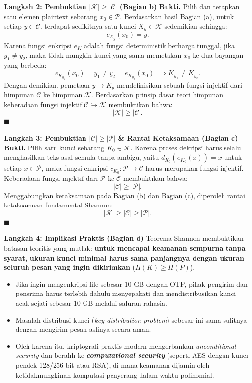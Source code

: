 \documentclass[11pt,a4paper]{article}
\newenvironment{proof}{\noindent\textbf{Bukti.}}{\hfill$\blacksquare$\vspace{0.3em}}
\begin{document}
\noindent\textbf{Langkah 2: Pembuktian $|\mathcal{K}| \ge |\mathcal{C}|$ (Bagian b)}
\begin{proof}
Pilih dan tetapkan satu elemen plaintext sebarang $x_0 \in \mathcal{P}$.
Berdasarkan hasil Bagian (a), untuk setiap $y \in \mathcal{C}$, terdapat sedikitnya satu kunci $K_y \in \mathcal{K}$ sedemikian sehingga:
\[
e_{K_y}(x_0) = y.
\]
Karena fungsi enkripsi $e_K$ adalah fungsi deterministik berharga tunggal, jika $y_1 \neq y_2$, maka tidak mungkin kunci yang sama memetakan $x_0$ ke dua bayangan yang berbeda:
\[
e_{K_{y_1}}(x_0) = y_1 \neq y_2 = e_{K_{y_2}}(x_0) \implies K_{y_1} \neq K_{y_2}.
\]
Dengan demikian, pemetaan $y \mapsto K_y$ mendefinisikan sebuah fungsi injektif dari himpunan $\mathcal{C}$ ke himpunan $\mathcal{K}$.
Berdasarkan prinsip dasar teori himpunan, keberadaan fungsi injektif $\mathcal{C} \hookrightarrow \mathcal{K}$ membuktikan bahwa:
\[
\mathbf{|\mathcal{K}| \ge |\mathcal{C}|}.
\]
\end{proof}

\noindent\textbf{Langkah 3: Pembuktian $|\mathcal{C}| \ge |\mathcal{P}|$ \& Rantai Ketaksamaan (Bagian c)}
\begin{proof}
Pilih satu kunci sebarang $K_0 \in \mathcal{K}$.
Karena proses dekripsi harus selalu menghasilkan teks asal semula tanpa ambigu, yaitu $d_{K_0}(e_{K_0}(x)) = x$ untuk setiap $x \in \mathcal{P}$, maka fungsi enkripsi $e_{K_0}: \mathcal{P} \to \mathcal{C}$ harus merupakan fungsi injektif.
Keberadaan fungsi injektif dari $\mathcal{P}$ ke $\mathcal{C}$ membuktikan bahwa:
\[
|\mathcal{C}| \ge |\mathcal{P}|.
\]
Menggabungkan ketaksamaan pada Bagian (b) dan Bagian (c), diperoleh rantai ketaksamaan fundamental Shannon:
\[
\mathbf{|\mathcal{K}| \ge |\mathcal{C}| \ge |\mathcal{P}|}.
\]
\end{proof}

\noindent\textbf{Langkah 4: Implikasi Praktis (Bagian d)}
Teorema Shannon membuktikan batasan teoritis yang mutlak: \textbf{untuk mencapai keamanan sempurna tanpa syarat, ukuran kunci minimal harus sama panjangnya dengan ukuran seluruh pesan yang ingin dikirimkan} ($H(K) \ge H(P)$).
\begin{itemize}
    \item Jika ingin mengenkripsi file sebesar 10 GB dengan OTP, pihak pengirim dan penerima harus terlebih dahulu menyepakati dan mendistribusikan kunci acak sejati sebesar 10 GB melalui saluran rahasia.
    \item Masalah distribusi kunci (\textit{key distribution problem}) sebesar ini sama sulitnya dengan mengirim pesan aslinya secara aman.
    \item Oleh karena itu, kriptografi praktis modern mengorbankan \textit{unconditional security} dan beralih ke \textbf{\textit{computational security}} (seperti AES dengan kunci pendek 128/256 bit atau RSA), di mana keamanan dijamin oleh ketidakmungkinan komputasi penyerang dalam waktu polinomial.
\end{itemize}
\end{document}
